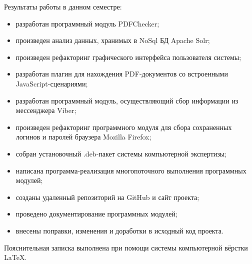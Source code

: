 Результаты работы в данном семестре:

\begin{itemize}
  \item разработан программный модуль PDFChecker;
  \item произведен анализ данных, хранимых в NoSql БД Apache Solr; 
  \item произведен рефакторинг графического интерфейса пользователя системы;
  \item разработан плагин для нахождения PDF-документов со встроенными JavaScript-сценариями;
  \item разработан программный модуль, осуществляющий сбор информации из мессенджера Viber;  
  \item произведен рефакторинг программного модуля для сбора сохраненных логинов и паролей браузера Mozilla Firefox;  
  \item собран установочный .deb-пакет системы компьютерной экспертизы;  
  \item написана программа-реализация многопоточного выполнения программных модулей; 
  \item созданы удаленный репозиторий на GitHub и сайт проекта;  
  \item проведено документирование программных модулей;
  \item внесены поправки, изменения и доработки в исходный код проекта.
\end{itemize}

Пояснительная записка выполнена при помощи системы компьютерной вёрстки \LaTeX.
